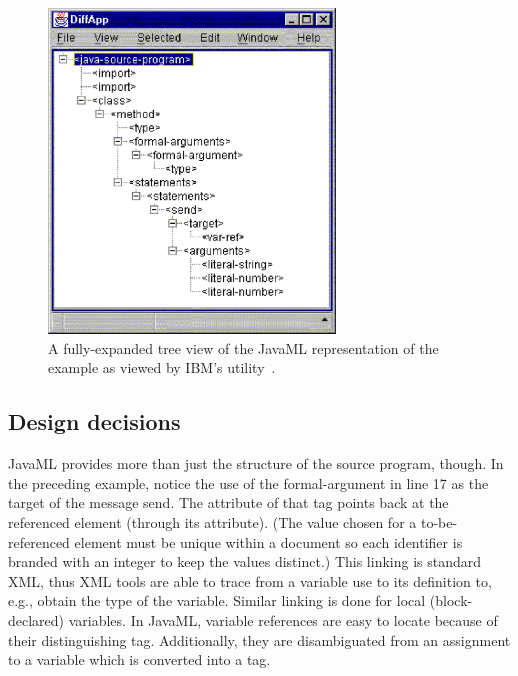 \documentclass{article}
\begin{document}
\begin{figure}[tb]
\includegraphics[width=3in]{treeview.eps}
\caption{A fully-expanded tree view of the JavaML representation 
of the  example as viewed by IBM's
 utility~\cite{XMLDiffMerge}.
\label{fig-treeview}}
\end{figure}

\subsection{Design decisions}
\label{ssec-design}

JavaML provides more than just the structure of the source program,
though.  In the preceding example, notice the use of the formal-argument
 in line 17 as the target of the message send.  The
 attribute of that  tag points
back at the referenced  element (through its
 attribute).  (The  value chosen for
a to-be-referenced element must be unique within a document so each 
identifier is branded with an
integer to keep the values distinct.)  This linking is standard XML, thus XML
tools are able to trace from a variable use to its definition to, e.g.,
obtain the type of the variable.  Similar linking is done for local
(block-declared) variables.  In JavaML, variable references are easy to
locate because of their distinguishing  tag.
Additionally, they are disambiguated from an assignment to a variable
which is converted into a  tag.
\end{document}
